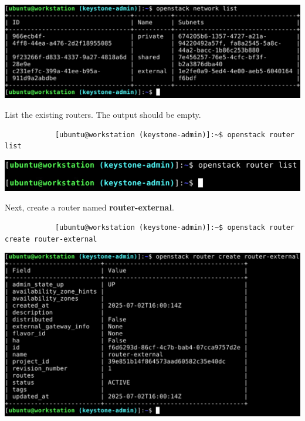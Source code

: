 \documentclass[letterpaper, 12pt]{article}
\begin{document}
\begin{enumerate}
\begin{labstep}
        \begin{center}
            \includegraphics[width=\linewidth]{images/part5/step12.png}
        \end{center}
    \end{labstep}

    \begin{labstep}
        List the existing routers.
        The output should be empty.
        \begin{lstlisting}
            [ubuntu@workstation (keystone-admin)]:~$ openstack router list
        \end{lstlisting}

        \begin{center}
            \includegraphics[width=\linewidth]{images/part5/step13.png}
        \end{center}
    \end{labstep}

    \begin{labstep}
        Next, create a router named \textbf{router-external}.
        \begin{lstlisting}
            [ubuntu@workstation (keystone-admin)]:~$ openstack router create router-external
        \end{lstlisting}

        \begin{center}
            \includegraphics[width=\linewidth]{images/part5/step14.png}
        \end{center}
    \end{labstep}


\end{enumerate}
\end{document}

